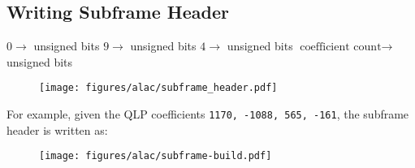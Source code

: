 \subsection{Writing Subframe Header}
$0 \rightarrow$  unsigned bits
$9 \rightarrow$  unsigned bits
$4 \rightarrow$  unsigned bits
$\text{coefficient count} \rightarrow$  unsigned bits\;
\EALGORITHM
\begin{figure}[h]
\texttt{[image: figures/alac/subframe\_header.pdf]}
\end{figure}
\par
\noindent
For example, given the QLP coefficients
\texttt{1170, -1088, 565, -161},
the subframe header is written as:
\begin{figure}[h]
\texttt{[image: figures/alac/subframe-build.pdf]}
\end{figure}
